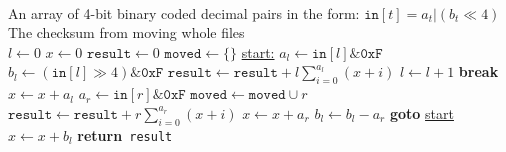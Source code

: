 \documentclass{article}
\begin{document}
\begin{algorithm}
    \caption{}
    \begin{algorithmic}
        \Require
            {\\An array of 4-bit binary coded decimal pairs in the form: $\texttt{in}[t]=a_t|(b_t\ll 4)$}
        \Ensure
            {\\The checksum from moving whole files\\}
        \hrulefill
        \State$l\gets 0$
        \State$x\gets 0$
        \State$\texttt{result}\gets 0$
        \State$\texttt{moved}\gets \{\}$
        \Loop
            \State\underline{start:}
            \State$a_l\gets \texttt{in}[l]\&\texttt{0xF}$
            \State$b_l\gets(\texttt{in}[l]\gg 4)\&\texttt{0xF}$
                \State$\texttt{result}\gets\texttt{result}+l\displaystyle\sum_{i=0}^{a_l}{(x+i)}$
            \EndIf
            \State$l\gets l+1$
                \State\textbf{break}
            \EndIf
            \State$x\gets x+a_l$
                \For{$r\in(\texttt{in.length},l]-\texttt{moved}$}
                    \State$a_r\gets\texttt{in}[r]\&\texttt{0xF}$
                        \State$\texttt{moved}\gets\texttt{moved}\cup r$
                        \State$\texttt{result}\gets\texttt{result}+r\displaystyle\sum_{i=0}^{a_r}{(x+i)}$
                        \State$x\gets x+a_r$
                        \State$b_l\gets b_l-a_r$
                            \State\textbf{goto }\underline{start}
                        \EndIf
                    \EndIf
                \EndFor
                \State$x\gets x+b_l$
            \EndIf
        \EndLoop
        \State\textbf{return}\texttt{ result}
    \end{algorithmic}
\end{algorithm}
\end{document}
